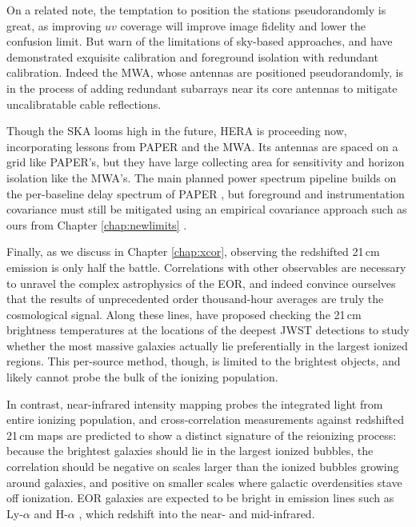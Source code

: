 On a related note, the temptation to position the stations pseudorandomly is great, as improving $uv$ coverage will improve image fidelity and lower the confusion limit. But \citet{beardsley16,ewallwice16b,barry16} warn of the limitations of sky-based approaches, and \citet{ali15} have demonstrated exquisite calibration and foreground isolation with redundant calibration. Indeed the MWA, whose antennas are positioned pseudorandomly, is in the process of adding redundant subarrays near its core antennas to mitigate uncalibratable cable reflections. 

Though the SKA looms high in the future, HERA is proceeding now, incorporating lessons from PAPER and the MWA. Its antennas are spaced on a grid like PAPER's, but they have large collecting area for sensitivity and horizon isolation like the MWA's. The main planned power spectrum pipeline builds on the per-baseline delay spectrum of PAPER \citep{deboer16,ewallwice16,neben16b,nithya16}, but foreground and instrumentation covariance must still be mitigated using an empirical covariance approach such as ours from Chapter \ref{chap:newlimits} \citep{parsons14,ali15}. 

Finally, as we discuss in Chapter \ref{chap:xcor}, observing the redshifted 21\,cm emission is only half the battle. Correlations with other observables are necessary to unravel the complex astrophysics of the EOR, and indeed convince ourselves that the results of unprecedented order thousand-hour averages are truly the cosmological signal. Along these lines, \citet{beardsley15} have proposed checking the 21\,cm brightness temperatures at the locations of the deepest JWST detections to study whether the most massive galaxies actually lie preferentially in the largest ionized regions. This per-source method, though, is limited to the brightest objects, and likely cannot probe the bulk of the ionizing population. 

In contrast, near-infrared intensity mapping probes the integrated light from entire ionizing population, and cross-correlation measurements against redshifted 21\,cm maps are predicted to show a distinct signature of the reionizing process: because the brightest galaxies should lie in the largest ionized bubbles, the correlation should be negative on scales larger than the ionized bubbles growing around galaxies, and positive on smaller scales where galactic overdensities stave off ionization. EOR galaxies are expected to be bright in emission lines such as Ly-$\alpha$ \citep{primevaltwins} and H-$\alpha$ \citep{brightemissionlines}, which redshift into the near- and mid-infrared.


